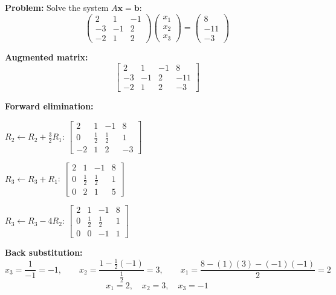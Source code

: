 \documentclass[12pt]{article}
\begin{document}
\bigskip

\begin{examplebox*}
\textbf{Problem:} Solve the system $A\mathbf{x} = \mathbf{b}$:
\[
  \begin{pmatrix}2 & 1 & -1\\-3 & -1 & 2\\-2 & 1 & 2\end{pmatrix}
  \begin{pmatrix}x_1\\x_2\\x_3\end{pmatrix}
  =\begin{pmatrix}8\\-11\\-3\end{pmatrix}
\]

\textbf{Augmented matrix:}
\[
  \left[\begin{array}{rrr|r}2 & 1 & -1 & 8\\-3 & -1 & 2 & -11\\-2 & 1 & 2 & -3\end{array}\right]
\]

\textbf{Forward elimination:}

$R_2 \leftarrow R_2 + \tfrac{3}{2}R_1$:\quad
$\left[\begin{array}{rrr|r}2 & 1 & -1 & 8\\0 & \tfrac{1}{2} & \tfrac{1}{2} & 1\\-2 & 1 & 2 & -3\end{array}\right]$

$R_3 \leftarrow R_3 + R_1$:\quad
$\left[\begin{array}{rrr|r}2 & 1 & -1 & 8\\0 & \tfrac{1}{2} & \tfrac{1}{2} & 1\\0 & 2 & 1 & 5\end{array}\right]$

$R_3 \leftarrow R_3 - 4R_2$:\quad
$\left[\begin{array}{rrr|r}2 & 1 & -1 & 8\\0 & \tfrac{1}{2} & \tfrac{1}{2} & 1\\0 & 0 & -1 & 1\end{array}\right]$

\textbf{Back substitution:}
\[
  x_3 = \frac{1}{-1} = -1, \qquad
  x_2 = \frac{1 - \tfrac{1}{2}(-1)}{\tfrac{1}{2}} = 3, \qquad
  x_1 = \frac{8 - (1)(3) - (-1)(-1)}{2} = 2
\]
\[
  \boxed{x_1 = 2,\quad x_2 = 3,\quad x_3 = -1}
\]
\end{examplebox*}
\end{document}
